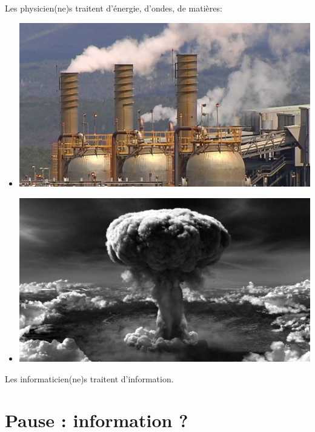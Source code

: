 \documentclass[french]{beamer}
\begin{document}
\begin{frame}
Les physicien(ne)s traitent d'énergie, d'ondes, de matières:

\begin{itemize}
\item \includegraphics[height=0.4\textheight]{./usine.jpg}

\item \includegraphics[height=0.4\textheight]{./hiroshima.jpg}
\end{itemize}



Les informaticien(ne)s traitent d'information.

\end{frame}

\section{Pause : information ?}
\end{document}
